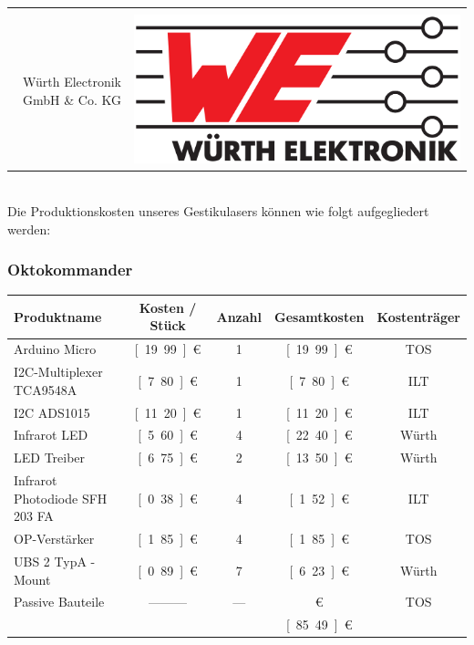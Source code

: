 \begin{tabularx}{\textwidth}{r c}
	\vspace{1.5cm} & \\
	Würth Electronik GmbH \& Co. KG & \noindent\parbox[c]{\hsize}{\includegraphics[scale=0.05]{../Logos/Wuerth.png}}
\end{tabularx} \\

\newpage
\noindent
Die Produktionskosten unseres Gestikulasers können wie folgt aufgegliedert werden:

\subsubsection*{Oktokommander} 
\begin{tabularx}{\textwidth}{p{4.5cm} | c c c c}
	Produktname		 			& Kosten / Stück 	& Anzahl & Gesamtkosten    & Kostenträger \\ 
	\hline
	Arduino Micro 				& \unit[19.99]{€}   &   1    & \unit[19.99]{€} & TOS 	\\ [2mm]
	I2C-Multiplexer TCA9548A	& \unit[7.80]{€}    &   1    & \unit[7.80]{€}  & ILT    \\ [8mm]
	I2C ADS1015					& \unit[11.20]{€}   &   1    & \unit[11.20]{€} & ILT    \\ [2mm]
	Infrarot LED    			& \unit[5.60]{€}	&   4    & \unit[22.40]{€} & Würth  \\ [2mm]
	LED Treiber     			& \unit[6.75]{€}    &   2    & \unit[13.50]{€} & Würth  \\ [2mm]
	Infrarot Photodiode SFH 203 FA&	\unit[0.38]{€}	&   4    & \unit[1.52]{€}  & ILT	\\ [8mm] 
	OP-Verstärker    			& \unit[1.85]{€}    &	4    & \unit[1.85]{€}  & TOS    \\ [2mm]
	UBS 2 TypA -Mount			& \unit[0.89]{€}    &   7    & \unit[6.23]{€}  & Würth  \\ [2mm]
	Passive Bauteile    		&	---------       &  ---   & \unit[1]{€}	   & TOS    \\ [2mm]
	\hline
								&					&		 & \unit[85.49]{€}	   &
\end{tabularx}\\

